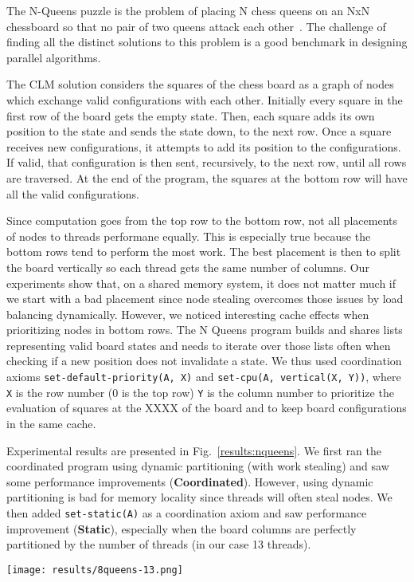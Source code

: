 The N-Queens puzzle is the problem of placing N chess queens on an NxN
chessboard so that no pair of two queens attack each
other~\cite{8queens}. The challenge of finding all the
distinct solutions to this problem is a good benchmark in designing
parallel algorithms.

The CLM solution considers the squares of the chess board as a graph
of nodes which exchange valid configurations with each
other. Initially every square in the first row of the board gets the
empty state.  Then, each square adds its own position to the state and
sends the state down, to the next row. Once a square receives new
configurations, it attempts to add its position to the
configurations. If valid, that configuration is then sent,
recursively, to the next row, until all rows are traversed. At the end
of the program, the squares at the bottom row will have all the valid
configurations.

Since computation goes from the top row to the bottom row, not all
placements of nodes to threads performane equally. This is especially
true because the bottom rows tend to perform the most work. The best
placement is then to split the board vertically so each thread gets
the same number of columns. Our experiments show that, on a shared
memory system, it does not matter much if we start with a bad
placement since node stealing overcomes those issues by load balancing
dynamically. However, we noticed interesting cache effects when
prioritizing nodes in bottom rows. The N Queens program builds and shares lists representing valid
board states and needs to iterate over those lists often when checking
if a new position does not invalidate a state.  We thus used
coordination axioms \texttt{set-default-priority(A, X)}
and \texttt{set-cpu(A, vertical(X, Y))}, where \texttt{X} is the row
number (0 is the top row) \texttt{Y} is the column number to
prioritize the evaluation of squares at the XXXX of the board and to
keep board configurations in the same cache. 

Experimental results are presented in Fig.~\ref{results:nqueens}.  We
first ran the coordinated program using dynamic partitioning (with
work stealing) and saw some performance improvements
(\textbf{Coordinated}). However, using dynamic partitioning is bad for
memory locality since threads will often steal nodes.  We then
added \texttt{set-static(A)} as a coordination axiom and saw
performance improvement (\textbf{Static}), especially when the board
columns are perfectly partitioned by the number of threads (in our
case 13 threads).

\begin{topfig}
   \begin{center}
      \texttt{[image: results/8queens-13.png]}
   \end{center}
\end{topfig}
